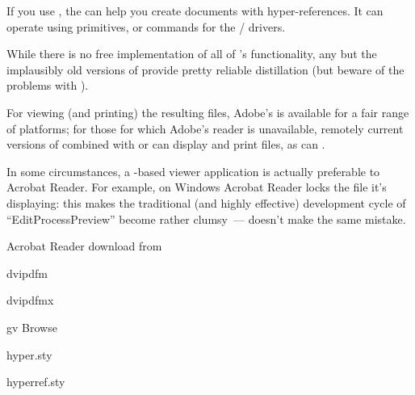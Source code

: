If you use \plaintex{}, the  can
help you create  documents with hyper-references.
It can operate using \PDFTeX{} primitives, or  commands
for the /  drivers.

While there is no free implementation of all of 
's
functionality, any but the implausibly old versions of
\href{http://www.ghostscript.com/}{}
provide pretty reliable distillation (but beware of the problems with
).

For viewing (and printing) the resulting files, Adobe's
  is available for a fair range of
platforms; for those for which Adobe's reader is unavailable, remotely
current versions of \href{http://www.ghostscript.com/}{}
combined with  or
\href{http://www.ghostgum.com.au/}{} can display and
print  files, as can .

In some circumstances, a
\href{http://www.ghostscript.com/}{}-based viewer
application is actually preferable to Acrobat Reader.  For example, on
Windows Acrobat Reader locks the  file it's displaying: this
makes the traditional (and highly effective) \AllTeX{} development
cycle of ``Edit\arrowhyph{}Process\arrowhyph{}Preview'' become
rather clumsy~--- \href{http://www.ghostgum.com.au/}{}
doesn't make the same mistake.
\begin{ctanrefs}
\item[\nothtml{\rmfamily}Acrobat Reader]download from 
\item[dvipdfm]
\item[dvipdfmx]
\item[gv]Browse 
\item[hyper.sty]
\item[hyperref.sty]
\end{ctanrefs}


